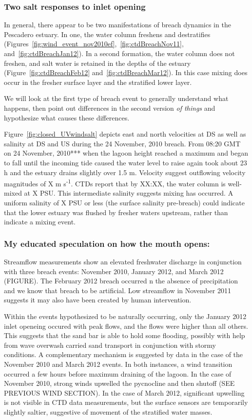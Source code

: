 \subsubsection{Two salt responses to inlet opening}
In general, there appear to be two manifestations of breach dynamics in the Pescadero estuary.  In one, the water column freshens and destratifies (Figures~\ref{fig:wind_event_nov2010ef},~\ref{fig:ctdBreachNov11}, and~\ref{fig:ctdBreachJan12}). In a second formation, the water column does not freshen, and salt water is retained in the depths of the estuary (Figure~\ref{fig:ctdBreachFeb12} and~\ref{fig:ctdBreachMar12}). In this case mixing does occur in the fresher surface layer and the stratified lower layer. 

We will look at the first type of breach event to generally understand what happens, then point out differences in the second version \emph{of things} and hypothesize what causes these differences. 

Figure~\ref{fig:closed_UVwindsalt} depicts east and north velocities at DS as well as salinity at DS and US during the 24 November, 2010 breach. From 08:20 GMT on 24 November, 2010*** when the lagoon height reached a maximum and began to fall until the incoming tide caused the water level to raise again took about 23 h and the estuary drains slightly over 1.5 m. Velocity suggest outflowing velocity magnitudes of X m s\textsuperscript{-1}. CTDs report that by XX:XX, the water column is well-mixed at X PSU. This intermediate salinity suggests mixing has occurred. A uniform salinity of X PSU or less (the surface salinity pre-breach) could indicate that the lower estuary was flushed by fresher waters upstream, rather than indicate a mixing event.


\subsubsection{My educated speculation on how the mouth opens:}
Streamflow measurements show an elevated freshwater discharge in conjunction with three breach events: November 2010, January 2012, and March 2012 (FIGURE). The February 2012 breach occurred n the absence of precipitation and we know that breach to be artificial. Low streamflow in November 2011 suggests it may also have been created by human intervention. 

Within the events hypothesized to be naturally occurring, only the January 2012 inlet openeing occured with peak flows, and the flows were higher than all others. This suggests that the sand bar is able to hold some flooding, possibly with help from wave overwash carried sand transport in conjunction with stormy conditions.  A complementary mechanism is suggested by data in the case of the November 2010 and March 2012 events. In both instances, a wind transition occurred a few hours before maximum draining of the lagoon. In the case of November 2010, strong winds upwelled the pycnocline and then shutoff (SEE PREVIOUS WIND SECTION). In the case of March 2012, significant upwelling is not visible in CTD data measurements, but the surface sensors are temporarily slightly saltier, suggestive of movement of the stratified water masses. 

